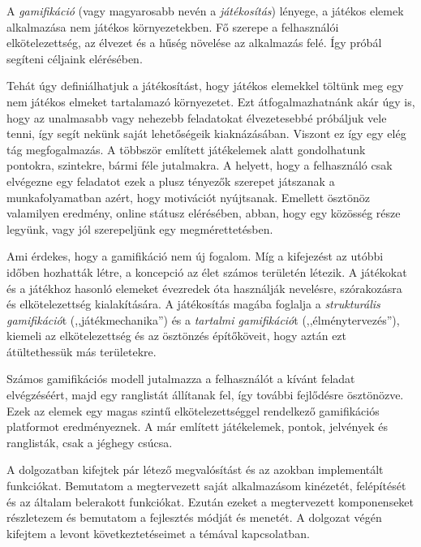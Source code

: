 
A \textit{gamifikáció} (vagy magyarosabb nevén a \textit{játékosítás}) lényege, a játékos elemek alkalmazása nem játékos környezetekben. Fő szerepe a felhasználói elkötelezettség, az élvezet és a hűség növelése az alkalmazás felé. Így próbál segíteni céljaink elérésében. \newline

Tehát úgy definiálhatjuk a játékosítást, hogy játékos elemekkel töltünk meg egy nem játékos elmeket tartalamazó környezetet. Ezt átfogalmazhatnánk akár úgy is, hogy az unalmasabb vagy nehezebb feladatokat élvezetesebbé próbáljuk vele tenni, így segít nekünk saját lehetőségeik kiaknázásában. Viszont ez így egy elég tág megfogalmazás. A többször említett játékelemek alatt gondolhatunk pontokra, szintekre, bármi féle jutalmakra. A helyett, hogy a felhasználó csak elvégezne egy feladatot ezek a plusz tényezők szerepet játszanak a munkafolyamatban azért, hogy motivációt nyújtsanak. Emellett ösztönöz valamilyen eredmény, online státusz elérésében, abban, hogy egy közösség része legyünk, vagy jól szerepeljünk egy megmérettetésben. \newline

Ami érdekes, hogy a gamifikáció nem új fogalom. Míg a kifejezést az utóbbi időben hozhatták létre, a koncepció az élet számos területén létezik. A játékokat és a játékhoz hasonló elemeket évezredek óta használják nevelésre, szórakozásra és elkötelezettség kialakítására. A játékosítás magába foglalja a \textit{strukturális gamifikáció}t (,,játékmechanika'') és a \textit{tartalmi gamifikáció}t (,,élménytervezés''), kiemeli az elkötelezettség és az ösztönzés építőköveit, hogy aztán ezt átültethessük más területekre. \newline

Számos gamifikációs modell jutalmazza a felhasználót a kívánt feladat elvégzéséért, majd egy ranglistát állítanak fel, így további fejlődésre ösztönözve. Ezek az elemek egy magas szintű elkötelezettséggel rendelkező gamifikációs platformot eredményeznek.
A már említett játékelemek, pontok, jelvények és ranglisták, csak a jéghegy csúcsa. \newline

A dolgozatban kifejtek pár létező megvalósítást és az azokban implementált funkciókat. Bemutatom a megtervezett saját alkalmazásom kinézetét, felépítését és az általam belerakott funkciókat. Ezután ezeket a megtervezett komponenseket részletezem és bemutatom a fejlesztés módját és menetét. A dolgozat végén kifejtem a levont következtetéseimet a témával kapcsolatban.
